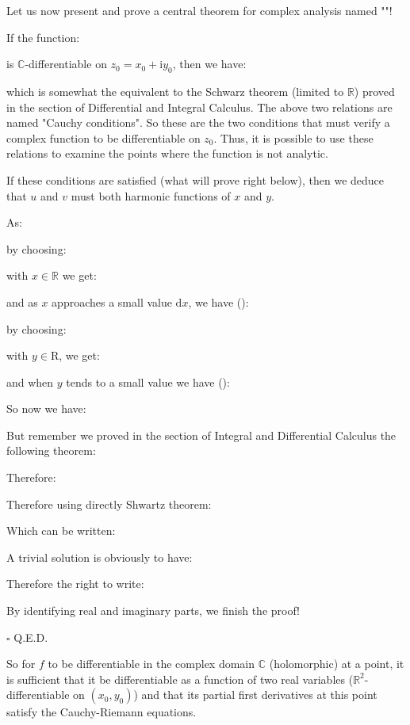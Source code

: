 	Let us now present and prove a central theorem for complex analysis named ""!
	
	If the function:
	
	is $\mathbb{C}$-differentiable on $z_0=x_0+\mathrm{i}y_0$, then we have:
	
	which is somewhat the equivalent to the Schwarz theorem (limited to $\mathbb{R}$) proved in the section of Differential and Integral Calculus. The above two relations are named "Cauchy conditions". So these are the two conditions that must verify a complex function to be differentiable on $z_0$. Thus, it is possible to use these relations to examine the points where the function is not analytic.
	
	\begin{theorem}
	If these conditions are satisfied (what will prove right below), then we deduce that $u$ and $v$ must both harmonic functions of $x$ and $y$.
	\end{theorem}
	\begin{dem}
	As:
	
	by choosing:
	
	with $x \in \mathbb{R}$ we get:
	
	and as $x$ approaches a small value $\mathrm{d}x$, we have ():
	
	by choosing:
	
	with $y \in \mathrm{R}$, we get:
	
	and when $y$ tends to a small value we have ():
	
	So now we have:
	
	But remember we proved in the section of Integral and Differential Calculus the following theorem:
	
	Therefore:
	
	Therefore using directly Shwartz theorem:
	
	Which can be written:
	
	A trivial solution is obviously to have:
	
	Therefore the right to write:
	
	By identifying real and imaginary parts, we finish the proof!
	\begin{flushright}
		$\square$  Q.E.D.
	\end{flushright}
	\end{dem}
	So for $f$ to be differentiable in the complex domain $\mathbb{C}$ (holomorphic) at a point, it is sufficient that it be differentiable as a function of two real variables ($\mathbb{R}^2$-differentiable on $(x_0,y_0)$) and that its partial first derivatives at this point satisfy the Cauchy-Riemann equations.
	
